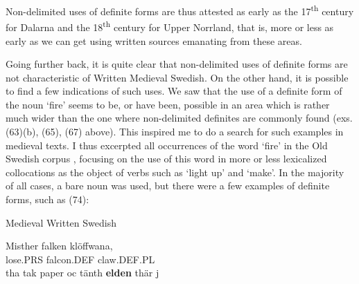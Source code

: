 
Non-delimited uses of definite forms are thus attested as early as the 17\textsuperscript{th} century for Dalarna and the 18\textsuperscript{th} century for Upper Norrland, that is, more or less as early as we can get using written sources emanating from these areas. 


Going further back, it is quite clear that non-delimited uses of definite forms are not characteristic of Written Medieval Swedish. On the other hand, it is possible to find a few indications of such uses. We saw that the use of a definite form of the noun  ‘fire’ seems to be, or have been, possible in an area which is rather much wider than the one where non-delimited definites are commonly found (exs. (63)(b), (65), (67) above). This inspired me to do a search for such examples in medieval texts. I thus excerpted all occurrences of the word  ‘fire’ in the Old Swedish corpus , focusing on the use of this word in more or less lexicalized collocations as the object of verbs such as  ‘light up’ and  ‘make’. In the majority of all cases, a bare noun was used, but there were a few examples of definite forms, such as (74):


\item 

\label{bkm:Ref64457141}Medieval Written Swedish



 \ea\label{}
\gll Misther  falken  klöffwana,\\


lose.PRS  falcon.DEF  claw.DEF.PL\\

 \ea\label{}
\gll tha  tak  paper  oc  tänth  \textbf{elden}  thär  j\\


